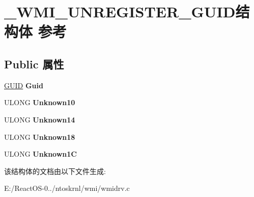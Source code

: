 \hypertarget{struct___w_m_i___u_n_r_e_g_i_s_t_e_r___g_u_i_d}{}\section{\+\_\+\+W\+M\+I\+\_\+\+U\+N\+R\+E\+G\+I\+S\+T\+E\+R\+\_\+\+G\+U\+I\+D结构体 参考}
\label{struct___w_m_i___u_n_r_e_g_i_s_t_e_r___g_u_i_d}
\subsection*{Public 属性}
\begin{DoxyCompactItemize}
\item 
\mbox{\label{struct___w_m_i___u_n_r_e_g_i_s_t_e_r___g_u_i_d_a68895736b977e999cba5c3847744d35d}} 
\hyperlink{interface_g_u_i_d}{G\+U\+ID} {\bfseries Guid}
\item 
\mbox{\label{struct___w_m_i___u_n_r_e_g_i_s_t_e_r___g_u_i_d_abbc58ef4cac4b1d2137d70c0cb9bed6c}} 
U\+L\+O\+NG {\bfseries Unknown10}
\item 
\mbox{\label{struct___w_m_i___u_n_r_e_g_i_s_t_e_r___g_u_i_d_a8fd54c61c65fe0411e7162b4c670337b}} 
U\+L\+O\+NG {\bfseries Unknown14}
\item 
\mbox{\label{struct___w_m_i___u_n_r_e_g_i_s_t_e_r___g_u_i_d_a97880199be22b33d795e2a6df10e4217}} 
U\+L\+O\+NG {\bfseries Unknown18}
\item 
\mbox{\label{struct___w_m_i___u_n_r_e_g_i_s_t_e_r___g_u_i_d_a9bd4acbbb82b23120eff82bd38ce7dce}} 
U\+L\+O\+NG {\bfseries Unknown1C}
\end{DoxyCompactItemize}


该结构体的文档由以下文件生成\+:\begin{DoxyCompactItemize}
\item 
E\+:/\+React\+O\+S-\/0../ntoskrnl/wmi/wmidrv.\+c\end{DoxyCompactItemize}
